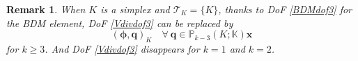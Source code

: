\documentclass[10pt]{amsart}
\newtheorem{lemma}[theorem]{Lemma}
\newtheorem{remark}[theorem]{Remark}
\newcommand{\bs}{\boldsymbol}
\newcommand{\curl}{\operatorname{curl}}
\newcommand{\grad}{\operatorname{grad}}
\numberwithin{equation}{section}
\begin{document}
\begin{remark}\rm
When $K$ is a simplex and $\mathcal T_K=\{K\}$, thanks to DoF \eqref{BDMdof3} for the BDM element, DoF \eqref{Vdivdof3} can be replaced by 
$$
(\boldsymbol{\phi}, \bs q)_K \quad\forall~\bs q\in \mathbb P_{k-3}(K;\mathbb K)\boldsymbol{x}
$$
for $k\geq3$.
And DoF \eqref{Vdivdof3} disappears for $k=1$ and $k=2$.
\end{remark}


\end{document}
